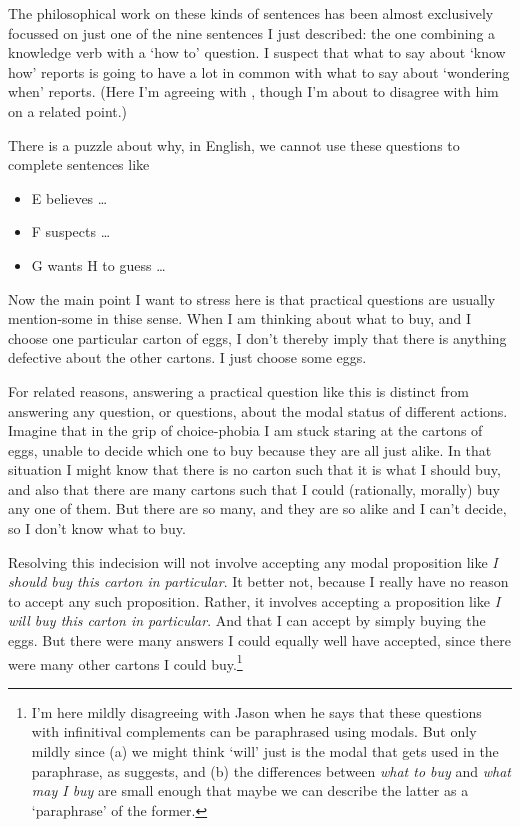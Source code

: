 \documentclass[11pt,]{book}
\providecommand{\tightlist}{%
  \setlength{\itemsep}{0pt}\setlength{\parskip}{0pt}}
\let\rmarkdownfootnote\footnote%
\def\footnote{\protect\rmarkdownfootnote}
\begin{document}
The philosophical work on these kinds of sentences has been almost exclusively focussed on just one of the nine sentences I just described: the one combining a knowledge verb with a `how to' question. I suspect that what to say about `know how' reports is going to have a lot in common with what to say about `wondering when' reports. (Here I'm agreeing with \citet{Stanley2011}, though I'm about to disagree with him on a related point.)

There is a puzzle about why, in English, we cannot use these questions to complete sentences like

\begin{itemize}
\tightlist
\item
  E believes \ldots{}
\item
  F suspects \ldots{}
\item
  G wants H to guess \ldots{}
\end{itemize}

Now the main point I want to stress here is that practical questions are usually mention-some in thise sense. When I am thinking about what to buy, and I choose one particular carton of eggs, I don't thereby imply that there is anything defective about the other cartons. I just choose some eggs.

For related reasons, answering a practical question like this is distinct from answering any question, or questions, about the modal status of different actions. Imagine that in the grip of choice-phobia I am stuck staring at the cartons of eggs, unable to decide which one to buy because they are all just alike. In that situation I might know that there is no carton such that it is what I should buy, and also that there are many cartons such that I could (rationally, morally) buy any one of them. But there are so many, and they are so alike and I can't decide, so I don't know what to buy.

Resolving this indecision will not involve accepting any modal proposition like \emph{I should buy this carton in particular}. It better not, because I really have no reason to accept any such proposition. Rather, it involves accepting a proposition like \emph{I will buy this carton in particular}. And that I can accept by simply buying the eggs. But there were many answers I could equally well have accepted, since there were many other cartons I could buy.\footnote{I'm here mildly disagreeing with Jason \citep[Ch. 5]{Stanley2011} when he says that these questions with infinitival complements can be paraphrased using modals. But only mildly since (a) we might think `will' just is the modal that gets used in the paraphrase, as \citet{Bhatt1999} suggests, and (b) the differences between \emph{what to buy} and \emph{what may I buy} are small enough that maybe we can describe the latter as a `paraphrase' of the former.}
\end{document}
